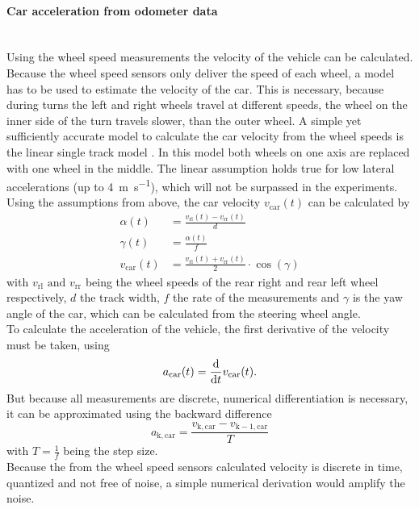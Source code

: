 \paragraph{Car acceleration from odometer data}\mbox{}
\label{para:acc_from_odom}\\
Using the wheel speed measurements the velocity of the vehicle can be calculated.
Because the wheel speed sensors only deliver the speed of each wheel, a model has to be used to estimate the velocity of the car.
This is necessary, because during turns the left and right wheels travel at different speeds, the wheel on the inner side of the turn travels slower, than the outer wheel.
A simple yet sufficiently accurate model to calculate the car velocity from the wheel speeds is the linear single track model \cite{Mitschke2014}.
In this model both wheels on one axis are replaced with one wheel in the middle.
The linear assumption holds true for low lateral accelerations (up to \SI{4}{\metre\per\second}), which will not be surpassed in the experiments.
Using the assumptions from above, the car velocity $v_\mathrm{car}(t)$ can be calculated by
\begin{align}
	\alpha(t)         & = \frac{v_\mathrm{rl}(t) - v_\mathrm{rr}(t)}{d}                  \\
	\gamma(t)         & = \frac{\alpha(t)}{f}                                            \\
	v_\mathrm{car}(t) & = \frac{v_\mathrm{rl}(t) + v_\mathrm{rr}(t)}{2}\cdot\cos(\gamma)
	\label{eq:v_car}
\end{align}
with $v_\mathrm{rl} \text{ and } v_\mathrm{rr}$ being the wheel speeds of the rear right and rear left wheel respectively, $d$ the track width, $f$ the rate of the measurements and $\gamma$ is the yaw angle of the car, which can be calculated from the steering wheel angle.\\
To calculate the acceleration of the vehicle, the first derivative of the velocity must be taken, using
\begin{equation}
	a_\mathrm{car}(t) = \dv{t}v_\mathrm{car}(t).
\end{equation}
But because all measurements are discrete, numerical differentiation is necessary, it can be approximated using the backward difference
\begin{equation}
	a_\mathrm{k, car} = \frac{v_\mathrm{k, car} - v_\mathrm{k - 1, car}}{T}
\end{equation}
with $T=\frac{1}{f}$ being the step size.\\
Because the from the wheel speed sensors calculated velocity is discrete in time, quantized and not free of noise, a simple numerical derivation would amplify the noise.
